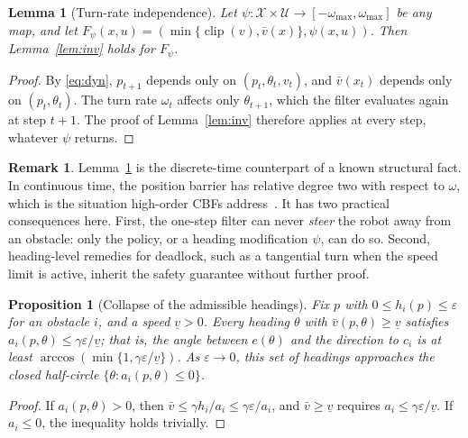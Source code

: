\documentclass[11pt]{article}
\newtheorem{proposition}{Proposition}
\newtheorem{lemma}{Lemma}
\theoremstyle{definition}
\newtheorem{remark}{Remark}
\theoremstyle{remark}
\begin{document}
\begin{lemma}[Turn-rate independence]\label{prop:heading}
Let $\psi:\mathcal X\times\mathcal U\to[-\omega_{\max},\omega_{\max}]$ be any map, and let $F_\psi(x,u)=(\min\{\operatorname{clip}(v),\bar v(x)\},\psi(x,u))$. Then Lemma~\ref{lem:inv} holds for $F_\psi$.
\end{lemma}
\begin{proof}
By \eqref{eq:dyn}, $p_{t+1}$ depends only on $(p_t,\theta_t,v_t)$, and $\bar v(x_t)$ depends only on $(p_t,\theta_t)$. The turn rate $\omega_t$ affects only $\theta_{t+1}$, which the filter evaluates again at step $t+1$. The proof of Lemma~\ref{lem:inv} therefore applies at every step, whatever $\psi$ returns.
\end{proof}

\begin{remark}
Lemma~\ref{prop:heading} is the discrete-time counterpart of a known structural fact. In continuous time, the position barrier has relative degree two with respect to $\omega$, which is the situation high-order CBFs address~\cite{xiao2022hocbf}. It has two practical consequences here. First, the one-step filter can never \emph{steer} the robot away from an obstacle: only the policy, or a heading modification $\psi$, can do so. Second, heading-level remedies for deadlock, such as a tangential turn when the speed limit is active, inherit the safety guarantee without further proof.
\end{remark}

\begin{proposition}[Collapse of the admissible headings]\label{prop:cone}
Fix $p$ with $0\le h_i(p)\le\varepsilon$ for an obstacle $i$, and a speed $\underline v>0$. Every heading $\theta$ with $\bar v(p,\theta)\ge\underline v$ satisfies $a_i(p,\theta)\le\gamma\varepsilon/\underline v$; that is, the angle between $e(\theta)$ and the direction to $c_i$ is at least $\arccos(\min\{1,\gamma\varepsilon/\underline v\})$. As $\varepsilon\to0$, this set of headings approaches the closed half-circle $\{\theta: a_i(p,\theta)\le0\}$.
\end{proposition}
\begin{proof}
If $a_i(p,\theta)>0$, then $\bar v\le\gamma h_i/a_i\le\gamma\varepsilon/a_i$, and $\bar v\ge\underline v$ requires $a_i\le\gamma\varepsilon/\underline v$. If $a_i\le0$, the inequality holds trivially.
\end{proof}
\end{document}
